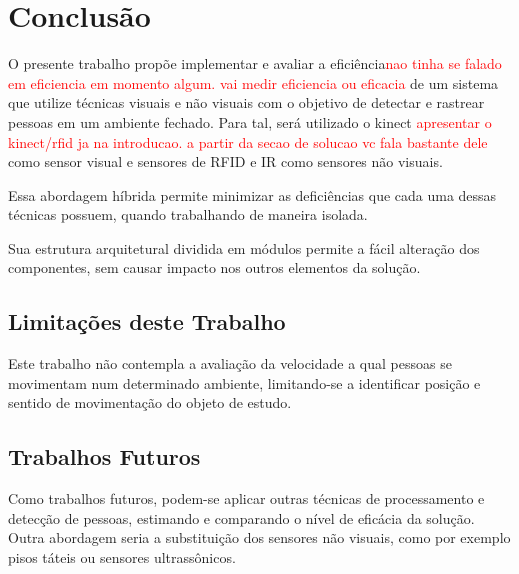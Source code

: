 \section{Conclusão}\label{sec:conclusao}

O presente trabalho propõe implementar e avaliar a eficiência\textcolor{red}{nao tinha se falado em eficiencia em momento algum. vai medir eficiencia ou eficacia} de um sistema que utilize técnicas visuais e não visuais com o objetivo de detectar e rastrear pessoas em um ambiente fechado. Para tal, será utilizado o kinect \textcolor{red}{apresentar o kinect/rfid ja na introducao. a partir da secao de solucao vc fala bastante dele} como sensor visual e sensores de RFID e IR como sensores não visuais.

Essa abordagem híbrida permite minimizar as deficiências que cada uma dessas técnicas possuem, quando trabalhando de maneira isolada.

Sua estrutura arquitetural dividida em módulos permite a fácil alteração dos componentes, sem causar impacto nos outros  elementos da solução. 

\subsection{Limitações deste Trabalho}
Este trabalho não contempla a avaliação da velocidade a qual pessoas se movimentam num determinado ambiente, limitando-se a identificar posição e sentido de movimentação do objeto de estudo.

\subsection{Trabalhos Futuros}
Como trabalhos futuros, podem-se aplicar outras técnicas de processamento e detecção de pessoas, estimando e comparando o nível de eficácia da solução. Outra abordagem seria a substituição dos sensores não visuais, como por exemplo pisos táteis ou sensores ultrassônicos.

